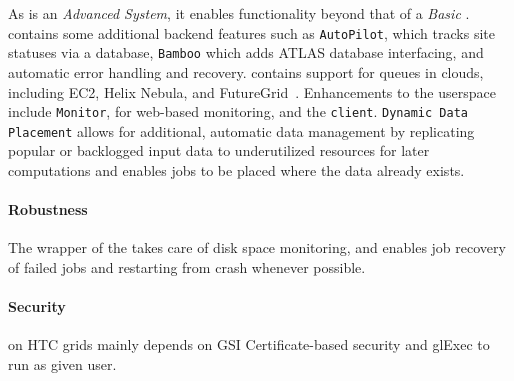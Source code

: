 \documentclass{sig-alternate}
\begin{document}
As \panda is an \textit{Advanced \pilotjob System}, it enables functionality
beyond that of a \textit{Basic \pilotjob}.
\panda contains some additional backend features such as \texttt{AutoPilot},
which tracks site statuses via a database, \texttt{Bamboo} which adds ATLAS
database interfacing, and automatic error handling and recovery.
\panda contains support for queues in clouds, including EC2, Helix Nebula, and
FutureGrid~\cite{pandapresentation2013-06}.
Enhancements to the userspace include \texttt{Monitor}, for web-based
monitoring, and the \texttt{\panda client}.  \texttt{\panda Dynamic Data
Placement} \cite{maeno_pd2p:_2012} allows for additional, automatic data
management by replicating popular or backlogged input data to underutilized
resources for later computations and enables jobs to be placed where the data
already exists.

\paragraph{Robustness}
The wrapper of the \pilot takes care of disk space monitoring, and enables job
recovery of failed jobs and restarting from crash whenever possible.

\paragraph{Security}
\panda on HTC grids mainly depends on GSI Certificate-based security and glExec
to run as given user.


\end{document}

